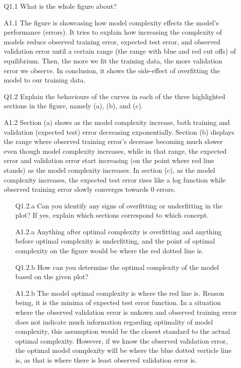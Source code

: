 \documentclass[11pt]{scrartcl}
\begin{document}
\begin{itemize}
\item[Q1.1] What is the whole figure about?  
\item[A1.1] The figure is showcasing how model complexity effects the model's performance (errors). It tries to explain how increasing the complexity of models reduce observed training error, expected test error, and observed validation error until a certain range (the range with blue and red cut offs) of equilibrium. Then, the more we fit the training data, the more validation error we observe. In conclusion, it shows the side-effect of overfitting the model to our training data. \\

\item[Q1.2] Explain the behaviours of the curves in each of the three highlighted sections in the figure, namely (a), (b), and (c).   
\item[A1.2] Section (a) shows as the model complexity increase, both training and validation (expected test) error decreasing exponentially. Section (b) displays the range where observed training error's decrease becoming much slower even though model complexity increases, while in that range, the expected error and validation error start increasing (on the point where red line stands) as the model complexity increases. In section (c), as the model complexity increases, the expected test error rises like a log function while observed training error slowly converges towards 0 errors.\\

\begin{itemize}
\item[Q1.2.a] Can you identify any signs of overfitting or underfitting in the plot? If yes, explain which sections correspond to which concept.
\item[A1.2.a] Anything after optimal complexity is overfitting and anything before optimal complexity is underfitting, and the point of optimal complexity on the figure would be where the red dotted line is.\\

\item[Q1.2.b] How can you determine the optimal complexity of the model based on the given plot?
\item[A1.2.b] The model optimal complexity is where the red line is. Reason being, it is the minima of expected test error function. In a situation where the observed validation error is unkown and observed training error does not indicate much information regarding optimality of model complexity, this assumption would be the closest standard to the actual optimal complexity. However, if we know the observed validation error, the optimal model complexity will be where the blue dotted verticle line is, as that is where there is least observed validation error is. \\
\end{itemize}
	

\end{itemize}
\end{document}
